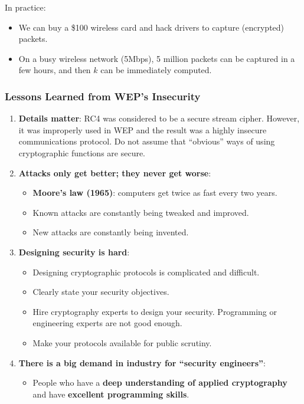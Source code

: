 \documentclass[12pt,titlepage]{article}
\begin{document}
In practice: \begin{itemize}
\item We can buy a \$100 wireless card and hack drivers to capture (encrypted) packets.
\item On a busy wireless network (5Mbps), 5 million packets can be captured in a few hours, and then $k$ can be immediately computed.
\end{itemize}

\subsubsection{Lessons Learned from WEP's Insecurity}
\begin{enumerate}
	\item \textbf{Details matter}: RC4 was considered to be a secure stream cipher. However, it was improperly used in WEP and the result was a highly insecure communications protocol. Do not assume that ``obvious'' ways of using cryptographic functions are secure.
	\item \textbf{Attacks only get better; they never get worse}: \begin{itemize}
	\item \textbf{Moore’s law (1965)}: computers get twice as fast every two years.
	\item Known attacks are constantly being tweaked and improved.
	\item New attacks are constantly being invented.
	\end{itemize}
	\item \textbf{Designing security is hard}:\begin{itemize}
	\item Designing cryptographic protocols is complicated and difficult.
	\item Clearly state your security objectives.
	\item Hire cryptography experts to design your security. Programming or engineering experts are not good enough.
	\item Make your protocols available for public scrutiny.
	\end{itemize}
	\item \textbf{There is a big demand in industry for ``security engineers''}: \begin{itemize}
	\item People who have a \textbf{deep understanding of applied cryptography} and have \textbf{excellent programming skills}.
	\end{itemize}
\end{enumerate}
\end{document}
